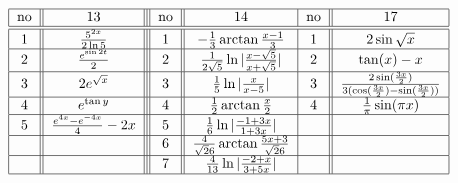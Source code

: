 \[ \begin{tabular}{| c || c || | c | | c |c | | c | }
\hline  no &         ${ 13}                                          $    & no    &  ${ 14}  $                                                              & no & ${ 17}  $       \\    \hline \hline
           $1$   &      $      \frac{5^{2x}}{2\ln 5}                  $        & $1$  &  $ -\frac{1}{3} \arctan\frac{x-1}{3}$                               & $1$ & $2\sin \sqrt x$			  \\ \hline 
           $2$   &      $        \frac{e^{\sin 2t}}{2}                  $       & $2$  &  $\frac{1}{2\sqrt 5 }\ln | \frac{x-\sqrt 5 }{x+\sqrt 5} |  $ & $2$ & $\tan (x) - x$         		\\ \hline
           $3$   &      $2e^{\sqrt x }                              $        & $3$  &  $\frac{1}{5}\ln | \frac{x }{x- 5} |$                                     & $3$ &  $\frac{2\sin(\frac{3x}{2})}{3(\cos(\frac{3x}{2})-\sin(\frac{3x}{2}))}$	\\ \hline  
           $4$   &      $ e^{\tan y}                                   $      &  $4$ &  $\frac{1}{2}\arctan \frac{x}{2}$    	                                & $4$ &	 $\frac{1}{\pi}\sin(\pi x)$					\\ \hline 
           $5$   &      $\frac{e^{4x}-e^{-4x}}{4}-2x               $        &  $5$ &  $\frac{1}{6}\ln|\frac{-1+3x}{1+3x} |$       		    &         &		 \\ \hline
                   &              							   & $6$  &  $\frac{4}{\sqrt 26}\arctan\frac{5x+3}{\sqrt 26} $ &         &       \\ \hline
                   &       			                                      & $7$  &  $\frac{4}{13}\ln|\frac{-2+x}{3+5x} | $                           &          &      \\ \hline
                        
\end{tabular} \]

